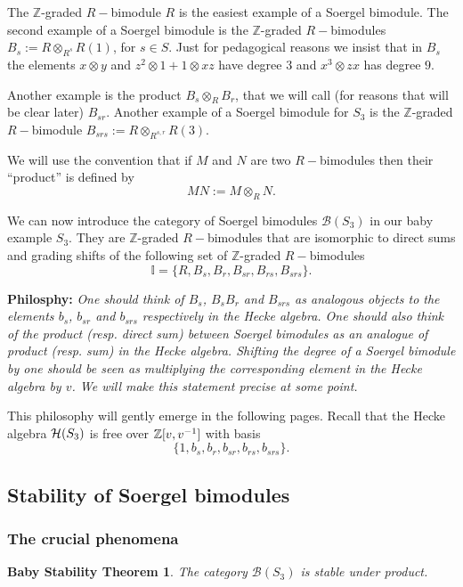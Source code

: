 \documentclass[12pt]{wart}
\newtheorem{st}[thm]{Baby Stability Theorem}
\theoremstyle{remark}
\def\II{\mathbb I}\def\JJ{\mathbb J}\def\KK{\mathbb K}\def\LL{\mathbb L}
\begin{document}
The $\mathbb{Z}$-graded $R-$bimodule $R$ is the easiest example of a Soergel bimodule.  The second example of a Soergel bimodule is  the  $\mathbb{Z}$-graded $R-$bimodules $B_s:=R\otimes_{R^s}R(1)$, for $s\in S$. Just for pedagogical reasons we insist that in $B_s$ the elements $x\otimes y$ and $z^2\otimes1 +1\otimes xz$ have degree $3$ and $x^3\otimes zx$ has degree $9.$ 


Another example is the product $B_s\otimes_R B_r$, that we will call (for reasons that will be clear later) $B_{sr}.$ Another example of  a Soergel bimodule for $S_3$ is the $\mathbb{Z}$-graded $R-$bimodule $B_{srs}:=R\otimes_{R^{s,r}}R(3)$.


We will use the convention that if $M$ and $N$ are two $R-$bimodules then their ``product'' is defined by $$MN:=M\otimes_R N.$$

We can now introduce the category of Soergel bimodules $\mathcal{B}(S_3)$ in our baby example $S_3$. They are $\mathbb{Z}$-graded $R-$bimodules that are isomorphic to direct sums and grading shifts of the following  set of $\mathbb{Z}$-graded $R-$bimodules
$$\II=\{R, B_s, B_r, B_{sr}, B_{rs}, B_{srs}\}.$$

\textbf{Philosphy: } \emph{One should think of $B_s$, $B_sB_r$ and $B_{srs}$ as analogous objects  to the elements $b_s$,  $b_{sr}$ and   $b_{srs}$ respectively in the Hecke algebra. One should also think of the product (resp. direct sum) between Soergel bimodules as an analogue of  product (resp. sum) in the Hecke algebra. Shifting the degree of a Soergel bimodule by one should be seen as multiplying the corresponding element in the Hecke algebra by $v$. We will make  this statement precise at some point.  }

This philosophy will gently emerge in the following pages. 
Recall that the Hecke algebra $\mathcal H(S_3)$ is free over $\mathbb Z[v,v^{-1}]$ with basis $$\{1, b_s, b_r,b_{sr}, b_{rs},b_{srs}\}.$$  

\subsection{Stability of Soergel bimodules}

 

\subsubsection{The crucial phenomena}\begin{st}\label{st}
The category $\mathcal{B}(S_3)$ is stable under product. 
\end{st}
\end{document}
